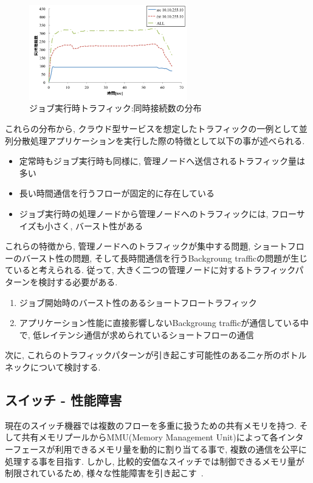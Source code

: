 \documentclass[11pt, a4paper, twocolumn]{jsarticle}
\begin{document}
\begin{figure}[t]
    \begin{center}
    \includegraphics[autoebb, width=195pt]{./img/job_conc.pdf}
    \caption{ジョブ実行時トラフィック:同時接続数の分布}
    \label{fig:job_conc}
    \end{center}
\end{figure}

これらの分布から, クラウド型サービスを想定したトラフィックの一例として並列分散処理アプリケーションを実行した際の特徴として以下の事が述べられる.
\begin{itemize}
  \item 定常時もジョブ実行時も同様に, 管理ノードへ送信されるトラフィック量は多い
  \item 長い時間通信を行うフローが固定的に存在している
  \item ジョブ実行時の処理ノードから管理ノードへのトラフィックには, フローサイズも小さく, バースト性がある
\end{itemize}

これらの特徴から, 管理ノードへのトラフィックが集中する問題, ショートフローのバースト性の問題,
そして長時間通信を行うBackgroung trafficの問題が生じていると考えられる.
従って, 大きく二つの管理ノードに対するトラフィックパターンを検討する必要がある.
\begin{enumerate}
  \item ジョブ開始時のバースト性のあるショートフロートラフィック
  \item アプリケーション性能に直接影響しないBackgroung trafficが通信している中で,
  低レイテンシ通信が求められているショートフローの通信
\end{enumerate}

次に, これらのトラフィックパターンが引き起こす可能性のある二ヶ所のボトルネックについて検討する.

\subsection{スイッチ - 性能障害}
\label{sec:switch}
現在のスイッチ機器では複数のフローを多重に扱うための共有メモリを持つ.
そして共有メモリプールからMMU(Memory Management Unit)によって各インターフェースが利用できるメモリ量を動的に割り当てる事で,
複数の通信を公平に処理する事を目指す.
しかし, 比較的安価なスイッチでは制御できるメモリ量が制限されているため,
様々な性能障害を引き起こす~\cite{flexible}.
\end{document}
